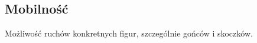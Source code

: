\subsection{Mobilność}
\label{subsec:mobilnosc}

{
    \color{red}
    \large Możliwość ruchów konkretnych figur, szczególnie gońców i skoczków.
}